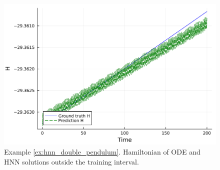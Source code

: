 \documentclass[final,onefignum,onetabnum]{siamart220329}
\newcounter{example}
\begin{document}
\begin{figure}[h!]
	\centering
	\includegraphics[width=0.5\linewidth]{../examples/double_pendulum_hnn/hamiltonian}
	\caption{Example \ref{ex:hnn_double_pendulum}. Hamiltonian of ODE and HNN solutions outside the training interval.}
	\label{fig:hnn_double_pendulum_hamiltonian}
\end{figure}



\end{document}
